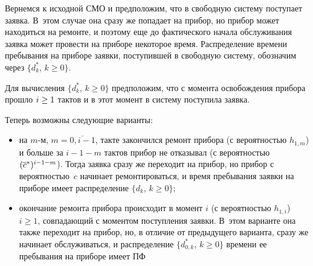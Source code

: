 \begin{multicols}{2}
Вернемся к исходной СМО и предположим, что в свободную
систему поступает заявка.
В~этом случае она сразу же попадает на прибор, но прибор
может находиться на ремонте, и поэтому еще до фактического
начала обслуживания заявка может провести на приборе
некоторое время.
Распределение времени пребывания на приборе заявки,
поступившей в свободную систему, обозначим через
$\{d^{*}_k$, $k\ge 0\}$.

Для вычисления $\{d^{*}_k$, $k\ge 0\}$ предположим, что
с момента освобождения прибора прошло $i\hm \ge 1$ тактов и в
этот момент в систему поступила заявка.

Теперь возможны следующие варианты:
\begin{itemize} %
\item на $m$-м, $m=\overline{0,i-1}$, такте закончился
ремонт прибора (с вероятностью $h_{1,m}$) и больше за
${i-1-m}$ тактов прибор не отказывал (с вероятностью
$(\overline c^*)^{i-1-m}$).
Тогда заявка сразу же переходит на прибор, но прибор с
ве\-ро\-ят\-ностью~$c$ начинает ремонтироваться, и время
пребывания заявки на приборе имеет распределение
$\{d_k$, $k\ge 0\}$;
\item
окончание ремонта прибора происходит в момент
$i$ (с вероятностью $h_{1,i}$) $i\ge 1$, сов\-па\-да\-ющий
с моментом поступления заявки.
В~этом варианте она также переходит на прибор, но, в
отличие от предыдущего варианта, сразу же начинает
обслуживаться, и распределение $\{d^*_{0,k}$, $k\ge 0\}$
времени ее пребывания на приборе имеет ПФ


\end{itemize}
\end{multicols}
